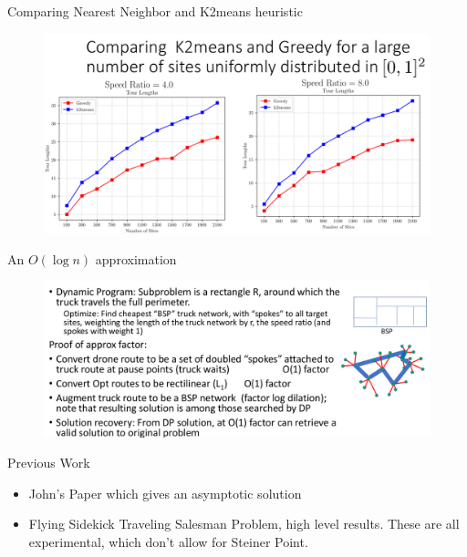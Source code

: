 \documentclass{beamer}
\begin{document}
\begin{frame}[t]{Comparing Nearest Neighbor and K2means heuristic}
  \vspace{-20pt}
  \begin{figure}
    \centering
     \includegraphics[width=12cm]{slide_imgs/compare_k2means_greedy.png}
   \end{figure}
\end{frame}



\begin{frame}{An $O(\log n)$ approximation}

  \begin{figure}
        \includegraphics[width=11.5cm]{slide_imgs/logn_approx.png}
  \end{figure}

\end{frame}

\begin{frame}{Previous Work}
  \begin{itemize}
       \item John's Paper which gives an asymptotic solution
       \item Flying Sidekick Traveling Salesman Problem, high
         level results. These are all experimental, which
         don't allow for Steiner Point.
  \end{itemize}
\end{frame}
\end{document}

